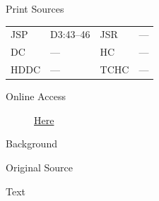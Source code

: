 			\begin{description}
				\item[Print Sources]
			\end{description}

				\begin{tabular}{p{0.5in}p{1in}p{0.5in}p{1in}}
				JSP	 	& D3:43--46		& JSR 		& --- \\
				DC	 	& --- 			& HC 		& --- \\
				HDDC 	& ---			& TCHC 		& --- \\
				\end{tabular}
			
			\begin{description}
				\item[Online Access] \href{https://www.josephsmithpapers.org/paper-summary/license-for-frederick-g-williams-20-march-1833/1}{Here}
			\end{description}
			
			\begin{description}
				\item[Background]
			\end{description}
			
			
			\begin{description}
				\item[Original Source]
			\end{description}
			
			
			\begin{description}
				\item[Text]
			\end{description}
			
